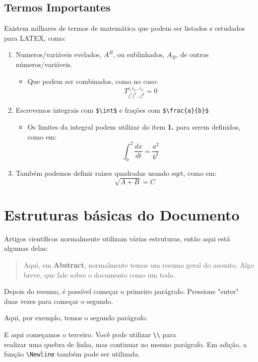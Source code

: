 \documentclass[12pt, a4paper]{article}
\begin{document}
\subsection{Termos Importantes}
Existem milhares de termos de matemática que podem ser listados e estudados para LATEX, como:
    \begin{enumerate}
        \item Numeros/variáveis evelados, $A^B$, ou sublinhados, $A_B$, de outros números/variáveis.
        \begin{itemize}
            \item Que podem ser combinados, como no caso:
            \[T^{i_1 i_2 \dots i_x}_{j^1 j^2 \dots j^y} = 0\]
        \end{itemize}
        \item Escrevemos integrais com \verb|$\int$| e frações com \verb|$\frac{a}{b}$|
        \begin{itemize}
            \item Os limites da integral podem utilizar do item \textbf{1.} para serem definidos, como em:
            \[ \int_0^2 \frac{dx}{dt} = \frac{a^2}{b^2}\]
        \end{itemize}
        \item Também podemos definir raizes quadradas usando sqrt, como em:
        \[\sqrt{A + B} = C\]
    \end{enumerate}

\section{Estruturas básicas do Documento}
Artigos científicos normalmente utilizam várias estruturas, então aqui está algumas delas:
\begin{abstract}
    Aqui, em \textbf{Abstract}, normalmente temos um resumo geral do assunto. Algo breve, que fale sobre o documento como um todo.
\end{abstract}

Depois do resumo, é possível começar o primeiro parágrafo. Pressione "enter" duas vezes para começar o segundo.

Aqui, por exemplo, temos o segundo parágrafo.

E aqui começamos o terceiro. Você pode utilizar \verb|\\| para \\ realizar uma quebra de linha, mas continuar no mesmo parágrafo. Em adição, a função \verb|\Newline| \newline também pode ser utilizada.
\end{document}
